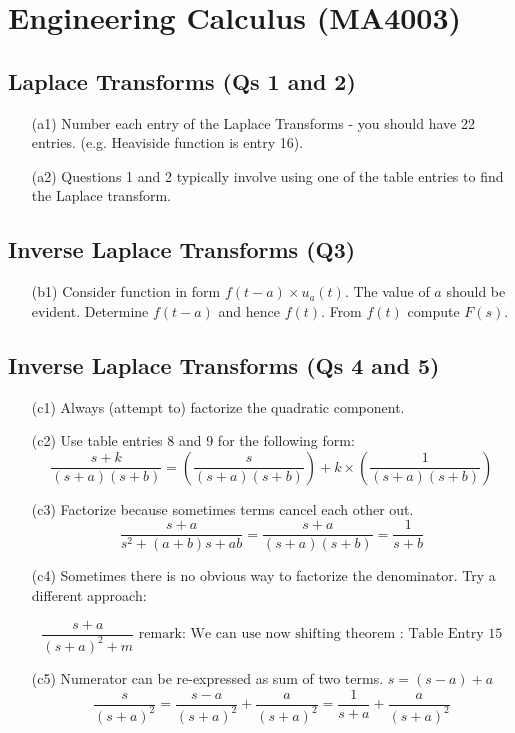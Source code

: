 \documentclass[11pt,a4paper,titlepage,oneside,openany]{article}
\numberwithin{equation}{section}
\numberwithin{algorithm}{section}
\numberwithin{figure}{section}
\numberwithin{table}{section}
\begin{document}
\section*{Engineering Calculus (MA4003)}
\subsection*{Laplace Transforms (Qs 1 and 2)}
\begin{itemize}
\item[(a1)] Number each entry of the Laplace Transforms - you should have 22 entries. (e.g. Heaviside function is entry 16).
\item[(a2)] Questions 1 and 2 typically involve using one of the table entries to find the Laplace transform.
\end{itemize}
\subsection*{Inverse Laplace Transforms (Q3)}
\begin{itemize}
\item[(b1)] Consider function in form $f(t-a) \times u_a(t)$. The value of $a$ should be evident. Determine $f(t-a)$ and hence $f(t)$. From $f(t)$ compute $F(s)$.
\end{itemize}

\subsection*{Inverse Laplace Transforms (Qs 4 and 5)}
\begin{itemize}
\item[(c1)]
Always (attempt to) factorize the quadratic component.
\item[(c2)] Use table entries 8 and 9 for the following form: \[ \frac{s+k}{(s+a)(s+b)} = \left( \frac{s}{(s+a)(s+b)} \right) + k \times \left( \frac{1}{(s+a)(s+b)} \right)  \]
\item[(c3)] Factorize because sometimes terms cancel each other out.
\[ \frac{s+a}{s^2+(a+b)s + ab}  = \frac{s+a}{(s+a)(s+b)} = \frac{1}{s+b} \]
\item[(c4)]
Sometimes there is no obvious way to factorize the denominator. Try a different approach:

\[ \frac{s+a}{(s+a)^2 + m}  \mbox{ remark: We can use now shifting theorem : Table Entry 15} \]
\item[(c5)]
Numerator can be re-expressed as sum of two terms. $ s = (s-a) + a $
\[ \frac{s}{(s+a)^2} =  \frac{s-a}{(s+a)^2} + \frac{a}{(s+a)^2}  = \frac{1}{s+a} + \frac{a}{(s+a)^2} \]
\end{itemize}
\end{document}
